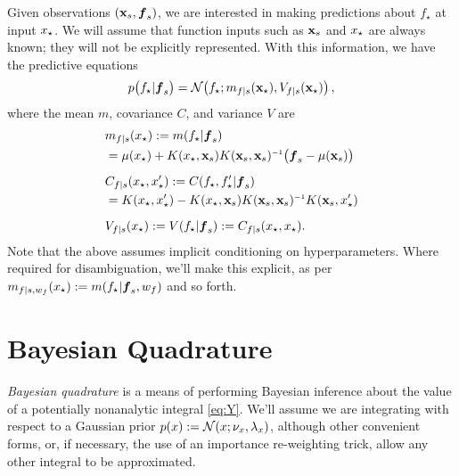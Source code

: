 \documentclass{article}
\renewcommand{\pskinny}[2]{p\big(#1|#2\big)}
\begin{document}
Given observations $(\vlfv_s,\vf_s)$, we are interested in making predictions about  $f_\star$ at input $\lfv_\star$. We will assume that function inputs such as $\vlfv_s$ and $\lfv_\star$ are always known; they will not be explicitly represented. With this information, we have the predictive equations
\begin{equation}
 \pskinny{f\st}{\vf_s} = 
\bN{f\st}
{\meancond{f}{\vlfv_\star}{s}}
{\covcond{f}{\vlfv_\star}{s}}\,,
\end{equation}
where the mean $m$, covariance $C$, and variance $V$ are
\begin{align} 
\textstyle
&\meancond{f}{\lfv_\star}{s}
\deq \mean{f_\star}{\vf_s}
\nonumber\\
&= \mu(\lfv_\star)+
K(\lfv_\star,\vlfv_s)
K(\vlfv_s,\vlfv_s)\inv
\bigl(\vf_s-{\mu}(\vlfv_s)\bigr)\label{eq:GPMean}
\\[0.2cm]
&C_{f|s}(\lfv_\star, \lfv'_\star)
\deq C(f_\star,f'_\star|\vf_s) 
\nonumber\\
&=K(\lfv_\star,\lfv'_\star) - 
K(\lfv_\star,\vlfv_s)
K(\vlfv_s,\vlfv_s)\inv
K(\vlfv_s,\lfv'_\star)%
\\[0.2cm]
&\covcond{f}{\lfv_\star}{s}
\deq {\cov{f_\star}{\vf_s}} 
\deq C_{f|s}(\lfv_\star, \lfv_\star).
\end{align} 
Note that the above assumes implicit conditioning on hyperparameters. Where required for disambiguation, we'll make this explicit, as per $m_{f|s,w_f}(x\st) \deq \mean{f\st}{\vf_s, w_f}$ and so forth.

\section{Bayesian Quadrature} \label{sec:bq}


\emph{Bayesian quadrature} \citep{BZHermiteQuadrature,BZMonteCarlo} is a means of performing Bayesian inference about the value of a potentially nonanalytic integral \eqref{eq:Y}.
We'll assume we are integrating with respect to a Gaussian prior
$\po{\lfv} \deq \N{\lfv}{\nu_{\lfv}}{\lambda_{\lfv}}$,
although other convenient forms, or, if necessary, the use of an importance re-weighting trick, allow any other integral to be approximated. 
\end{document}
